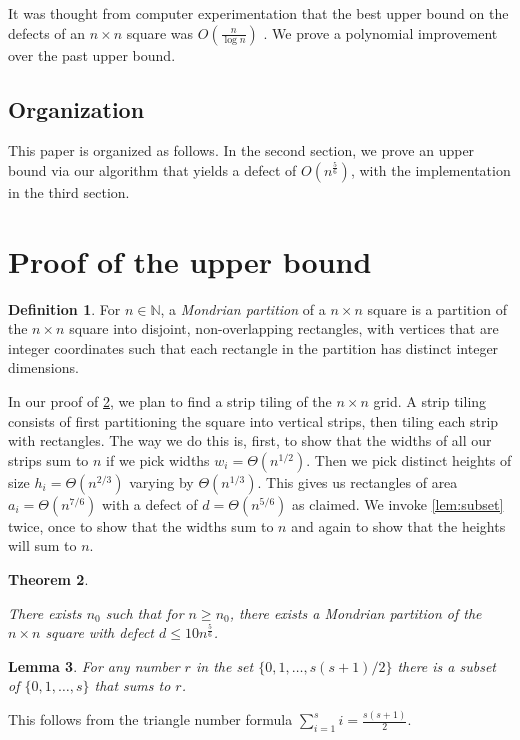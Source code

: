\documentclass[11pt, reqno, psamsfonts]{amsart}
\theoremstyle{plain}
\newtheorem{theorem}{Theorem}[section]
\newtheorem{lemma}[theorem]{Lemma}
\theoremstyle{definition}
\newtheorem{definition}[theorem]{Definition}
\theoremstyle{remark}
\begin{document}
It was thought from computer experimentation that the best upper bound on the defects of an $n\times n$ square was $O(\frac{n}{\log n})$ \cite{OEIS:A276523}. We prove a polynomial improvement over the past upper bound.
 
\subsection{Organization}
This paper is organized as follows. In the second section, we prove an upper bound via our algorithm that yields a defect of $O(n^{\frac{5}{6}})$, with the implementation in the third section. 
 
\section{Proof of the upper bound}\label{sec:proof}
\begin{definition}
For $n \in \mathbb{N}$, a \textit{Mondrian partition} of a $n\times n$ square is a partition of the $n\times n$ square into disjoint, non-overlapping rectangles, with vertices that are integer coordinates such that each rectangle in the partition has distinct integer dimensions.
\end{definition}
In our proof of \cref{thm:main}, we plan to find a strip tiling of the $n \times n$ grid. A strip tiling consists of first partitioning the square into vertical strips, then tiling each strip with rectangles. The way we do this is, first, to show that the widths of all our strips sum to $n$ if we pick widths $w_i=\Theta(n^{1/2})$. Then we pick distinct heights of size $h_i=\Theta(n^{2/3})$ varying by $\Theta(n^{1/3})$. This gives us rectangles of area $a_i=\Theta(n^{7/6})$ with a defect of $d=\Theta(n^{5/6})$ as claimed. We invoke \cref{lem:subset} twice, once to show that the widths sum to $n$ and again to show that the heights will sum to $n$.
\begin{theorem}\label{thm:main}

There exists $n_0$ such that for $n\geq n_0$, there exists a Mondrian partition of the $n\times n$ square with defect  $d\leq 10 n^\frac{5}{6}$.

\end{theorem}
\begin{lemma}\label{lem:triangle}
   For any number $r$ in the set $\{0,1, \ldots, s(s + 1)/2\}$ there is a subset of $\{0,1, \ldots, s\}$ that sums to $r$.
\end{lemma}
This follows from the triangle number formula $\sum_{i=1}^s i=\frac{s(s+1)}{2}$.
\end{document}
